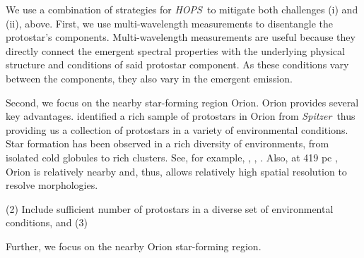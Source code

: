 \documentclass[manuscript]{aastex61}
\newcommand{\spitzer}{{\em Spitzer}}
\begin{document}
\par
We use a combination of strategies for {\it HOPS}\  to mitigate both challenges (i) and (ii), above.  First, we use multi-wavelength measurements to disentangle the protostar's components.  Multi-wavelength measurements are useful because they directly connect the emergent spectral properties with the underlying physical structure and conditions of said protostar component.  As these conditions vary between the components, they also vary in the emergent emission.  
\par
Second, we focus on the nearby star-forming region Orion.  Orion provides several key advantages.  \cite{orion} identified a rich sample of protostars in Orion from \spitzer\ thus providing us a collection of protostars in a variety of environmental conditions.  Star formation has been observed in a rich diversity of environments, from isolated cold globules to rich clusters. See, for example, \cite{carpenter}, \cite{feigelson}, \cite{amy2010}.   Also, at 419 pc \citep{schlafly} , Orion is relatively nearby and, thus, allows relatively high spatial resolution to resolve morphologies.

(2) Include sufficient number of protostars in a diverse set of environmental conditions, and (3) 

Further, we focus on the nearby Orion star-forming region.
\end{document}
